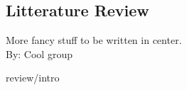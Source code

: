 \cleardoublepage
\begin{centering}
 \chapter*{Litterature Review}
More fancy stuff to be written in center.\\
By: Cool group
\end{centering}
\cleardoublepage
  {review/intro}